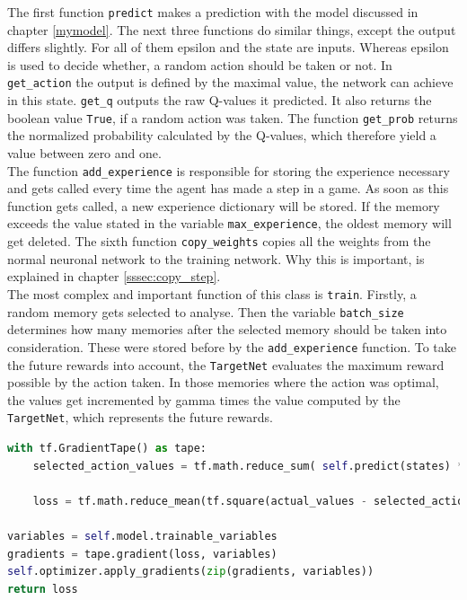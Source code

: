\documentclass[12pt]{article}
\begin{document}
The first function \lstinline{predict} makes a prediction with the model discussed in chapter \ref{mymodel}. The next three functions do similar things, except the \gls{output} differs slightly. For all of them  epsilon and the \gls{state} are  \glspl{input}. Whereas epsilon is used to decide whether, a random action should be taken or not. In \lstinline{get_action} the \gls{output} is defined by the maximal value, the network can achieve in this \gls{state}.  \lstinline{get_q} \glspl{output} the raw \glspl{Q-value} it predicted. It also returns the boolean value \lstinline{True}, if a random action was taken. The function \lstinline{get_prob}  returns the normalized probability calculated by the \glspl{Q-value}, which therefore yield a value between zero and one. \\ The function \lstinline{add_experience} is responsible for storing the \gls{experience} necessary and gets called every time the agent has made a step in a game. As soon as this function gets called, a new \gls{experience} dictionary will be stored. If the \gls{memory} exceeds the value stated in the variable \lstinline{max_experience}, the oldest \gls{memory} will get deleted. The sixth function \lstinline{copy_weights} copies all the \glspl{weight} from the normal \gls{neuronal network} to the training network. Why this is important, is explained in chapter \ref{sssec:copy_step}.\\
The most complex and important function of this class is \lstinline{train}. Firstly, a random \gls{memory} gets selected to analyse. Then the variable \lstinline{batch_size} determines how many memories after the selected \gls{memory} should be taken into consideration. These were stored before by the \lstinline{add_experience} function. To take the future \glspl{reward} into account, the \lstinline{TargetNet} evaluates the maximum \gls{reward} possible by the action taken. In those memories where the action was optimal, the values get incremented by \gls{gamma} times the value computed by the \lstinline{TargetNet}, which represents the future \glspl{reward}. 
\begin{lstlisting}[language=Python, caption = Example - Optimization of the network]
with tf.GradientTape() as tape:
    selected_action_values = tf.math.reduce_sum( self.predict(states) * tf.one_hot(actions, self.num_actions), axis=1) 

    loss = tf.math.reduce_mean(tf.square(actual_values - selected_action_values)) 
    
variables = self.model.trainable_variables
gradients = tape.gradient(loss, variables)
self.optimizer.apply_gradients(zip(gradients, variables)) 
return loss
\end{lstlisting}
\end{document}
